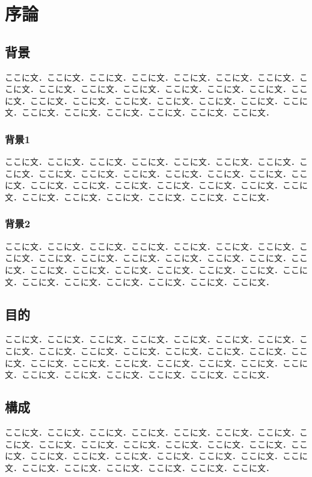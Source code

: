 \chapter{序論}
\section{背景}
ここに文．ここに文．ここに文．ここに文．ここに文．ここに文．ここに文．ここに文．ここに文．ここに文．ここに文．ここに文．ここに文．ここに文．ここに文．ここに文．ここに文．ここに文．ここに文．ここに文．ここに文．ここに文．ここに文．ここに文．ここに文．ここに文．ここに文．ここに文．
\subsection{背景1}
ここに文．ここに文．ここに文．ここに文．ここに文．ここに文．ここに文．ここに文．ここに文．ここに文．ここに文．ここに文．ここに文．ここに文．ここに文．ここに文．ここに文．ここに文．ここに文．ここに文．ここに文．ここに文．ここに文．ここに文．ここに文．ここに文．ここに文．ここに文．
\subsection{背景2}
ここに文．ここに文．ここに文．ここに文．ここに文．ここに文．ここに文．ここに文．ここに文．ここに文．ここに文．ここに文．ここに文．ここに文．ここに文．ここに文．ここに文．ここに文．ここに文．ここに文．ここに文．ここに文．ここに文．ここに文．ここに文．ここに文．ここに文．ここに文．
\section{目的}
ここに文．ここに文．ここに文．ここに文．ここに文．ここに文．ここに文．ここに文．ここに文．ここに文．ここに文．ここに文．ここに文．ここに文．ここに文．ここに文．ここに文．ここに文．ここに文．ここに文．ここに文．ここに文．ここに文．ここに文．ここに文．ここに文．ここに文．ここに文．
\section{構成}
ここに文．ここに文．ここに文．ここに文．ここに文．ここに文．ここに文．ここに文．ここに文．ここに文．ここに文．ここに文．ここに文．ここに文．ここに文．ここに文．ここに文．ここに文．ここに文．ここに文．ここに文．ここに文．ここに文．ここに文．ここに文．ここに文．ここに文．ここに文．
